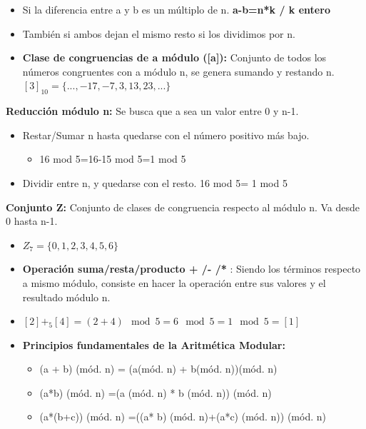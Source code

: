 \documentclass[12pt, twoside, openright]{report} %
\begin{document}
  \begin{itemize}
  \item Si la diferencia entre a y b es un múltiplo de n. \textbf{a-b=n*k /
    k entero}
    
  \item También si ambos dejan el mismo resto si los dividimos por n.
    
  \item \textbf{Clase de congruencias de a módulo ([a]):} Conjunto de
    todos los números congruentes con a módulo n, se genera sumando y
    restando n. $[3]_{10}=\{..., -17, -7, 3, 13, 23,...\}$
    
  \end{itemize}

  
  \textbf{Reducción módulo n:} Se busca que a sea un valor entre 0 y
  n-1.
  

  \begin{itemize}
  \item Restar/Sumar n hasta quedarse con el número positivo más bajo.
    

    \begin{itemize}
    \item 16 mod 5=16-15 mod 5=1 mod 5
      
    \end{itemize}
  \item Dividir entre n, y quedarse con el resto. 16 mod 5= 1 mod 5
    
  \end{itemize}

  
  \textbf{Conjunto Z:} Conjunto de clases de congruencia respecto al
  módulo n. Va desde 0 hasta n-1.
  

  \begin{itemize}
  \item
    
	$Z_7 = \{0, 1, 2, 3, 4, 5, 6\}$
    
  \end{itemize}

  \begin{itemize}
  \item \textbf{Operación suma/resta/producto + /- /*} : Siendo los términos
    respecto a mismo módulo, consiste en hacer la operación entre sus
    valores y el resultado módulo n.
    
  \item $[2]+_5[4]=(2+4) \mod 5 = 6 \mod 5 = 1 \mod 5 = [1]$
  \item \textbf{Principios fundamentales de la Aritmética Modular:}
    

    \begin{itemize}
    \item (a + b) (mód. n) = (a(mód. n) + b(mód. n))(mód. n)
      
    \item (a*b) (mód. n) =(a (mód. n) * b (mód. n)) (mód. n)
      
    \item (a*(b+c)) (mód. n) =((a* b) (mód. n)+(a*c) (mód. n)) (mód. n)
      
    \end{itemize}
  \end{itemize}
\end{document}
